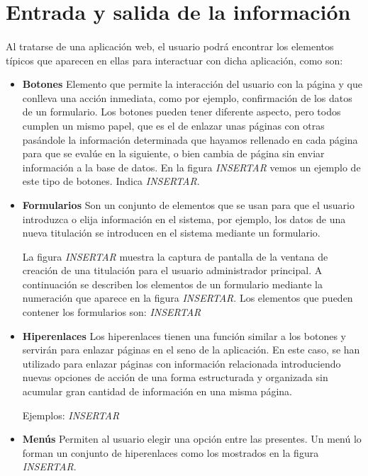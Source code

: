 \section{Entrada y salida de la información}

  \paragraph{}Al tratarse de una aplicación web, el usuario podrá encontrar los
  elementos típicos que aparecen en ellas para interactuar con dicha aplicación,
  como son:

  \begin{itemize}
   \item \textbf{Botones}
   Elemento que permite la interacción del usuario con la página
   y que conlleva una acción inmediata, como por ejemplo, confirmación de los
   datos de un formulario. Los botones pueden tener diferente aspecto, pero
   todos cumplen un mismo papel, que es el de enlazar unas páginas con otras
   pasándole la información determinada que hayamos rellenado en cada página
   para que se evalúe en la siguiente, o bien cambia de página sin enviar
   información a la base de datos. En la figura \textit{INSERTAR} vemos un
   ejemplo de este tipo de botones. Indica \textit{INSERTAR}.
   \item \textbf{Formularios}
   Son un conjunto de elementos que se usan para que el
   usuario introduzca o elija información en el sistema, por ejemplo, los
   datos de una nueva titulación se introducen en el sistema mediante un
   formulario.

   La figura \textit{INSERTAR} muestra la captura de pantalla de la ventana de
   creación de una titulación para el usuario administrador principal. A
   continuación se describen los elementos de un formulario mediante la
   numeración que aparece en la figura \textit{INSERTAR}. Los elementos que
   pueden contener los formularios son: \textit{INSERTAR}

   \item \textbf{Hiperenlaces}
   Los hiperenlaces tienen una función similar a los botones
   y servirán para enlazar páginas en el seno de la aplicación. En este caso,
   se han utilizado para enlazar páginas con información relacionada
   introduciendo nuevas opciones de acción de una forma estructurada y
   organizada sin acumular gran cantidad de información en una misma página.

   Ejemplos: \textit{INSERTAR}
   \item \textbf{Menús} Permiten al usuario elegir una opción entre las presentes. Un
   menú lo forman un conjunto de hiperenlaces como los mostrados en la figura
   \textit{INSERTAR}.
   \end{itemize}